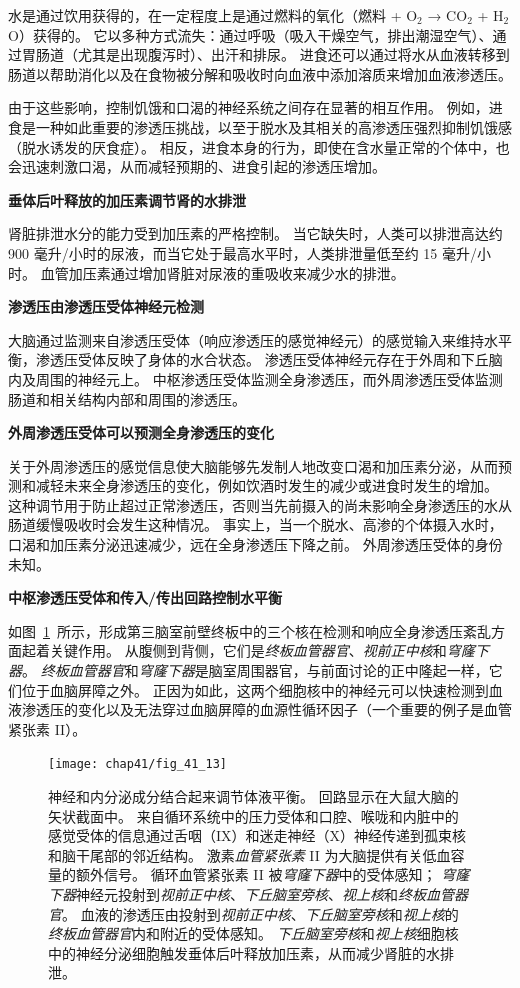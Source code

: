 水是通过饮用获得的，在一定程度上是通过燃料的氧化（燃料 + O$_2$ → CO$_2$ + H$_2$O）获得的。
它以多种方式流失：通过呼吸（吸入干燥空气，排出潮湿空气）、通过胃肠道（尤其是出现腹泻时）、出汗和排尿。
进食还可以通过将水从血液转移到肠道以帮助消化以及在食物被分解和吸收时向血液中添加溶质来增加血液渗透压。


由于这些影响，控制饥饿和口渴的神经系统之间存在显著的相互作用。
例如，进食是一种如此重要的渗透压挑战，以至于脱水及其相关的高渗透压强烈抑制饥饿感（脱水诱发的厌食症）。
相反，进食本身的行为，即使在含水量正常的个体中，也会迅速刺激口渴，从而减轻预期的、进食引起的渗透压增加。


\textbf{垂体后叶释放的加压素调节肾的水排泄}

肾脏排泄水分的能力受到加压素的严格控制。
当它缺失时，人类可以排泄高达约 900 毫升/小时的尿液，而当它处于最高水平时，人类排泄量低至约 15 毫升/小时。
血管加压素通过增加肾脏对尿液的重吸收来减少水的排泄。


\textbf{渗透压由渗透压受体神经元检测}

大脑通过监测来自渗透压受体（响应渗透压的感觉神经元）的感觉输入来维持水平衡，渗透压受体反映了身体的水合状态。
渗透压受体神经元存在于外周和下丘脑内及周围的神经元上。
中枢渗透压受体监测全身渗透压，而外周渗透压受体监测肠道和相关结构内部和周围的渗透压。


\textbf{外周渗透压受体可以预测全身渗透压的变化}

关于外周渗透压的感觉信息使大脑能够先发制人地改变口渴和加压素分泌，从而预测和减轻未来全身渗透压的变化，例如饮酒时发生的减少或进食时发生的增加。
这种调节用于防止超过正常渗透压，否则当先前摄入的尚未影响全身渗透压的水从肠道缓慢吸收时会发生这种情况。
事实上，当一个脱水、高渗的个体摄入水时，口渴和加压素分泌迅速减少，远在全身渗透压下降之前。
外周渗透压受体的身份未知。


\textbf{中枢渗透压受体和传入/传出回路控制水平衡}

如图~\ref{fig:41_13}~所示，形成第三脑室前壁终板中的三个核在检测和响应全身渗透压紊乱方面起着关键作用。
从腹侧到背侧，它们是\textit{终板血管器官}、\textit{视前正中核}和\textit{穹窿下器}。
\textit{终板血管器官}和\textit{穹窿下器}是脑室周围器官，与前面讨论的正中隆起一样，它们位于血脑屏障之外。
正因为如此，这两个细胞核中的神经元可以快速检测到血液渗透压的变化以及无法穿过血脑屏障的血源性循环因子（一个重要的例子是血管紧张素 II）。


\begin{figure}[htbp]
	\centering
	\texttt{[image: chap41/fig\_41\_13]}
	\caption{神经和内分泌成分结合起来调节体液平衡。
		回路显示在大鼠大脑的矢状截面中。
		来自循环系统中的压力受体和口腔、喉咙和内脏中的感觉受体的信息通过舌咽（IX）和迷走神经（X）神经传递到孤束核和脑干尾部的邻近结构。
		激素\textit{血管紧张素} II 为大脑提供有关低血容量的额外信号。
		循环血管紧张素 II 被\textit{穹窿下器}中的受体感知； 
		\textit{穹窿下器}神经元投射到\textit{视前正中核}、\textit{下丘脑室旁核}、\textit{视上核}和\textit{终板血管器官}。
		血液的渗透压由投射到\textit{视前正中核}、\textit{下丘脑室旁核}和\textit{视上核}的\textit{终板血管器官}内和附近的受体感知。
		\textit{下丘脑室旁核}和\textit{视上核}细胞核中的神经分泌细胞触发垂体后叶释放加压素，从而减少肾脏的水排泄\cite{swanson2000cerebral}。}
	\label{fig:41_13}
\end{figure}


